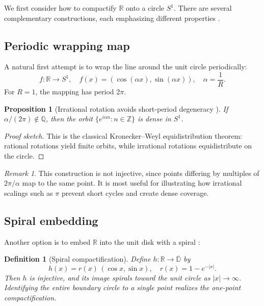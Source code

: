 \documentclass[12pt]{article}
\newtheorem{definition}{Definition}
\newtheorem{proposition}{Proposition}
\theoremstyle{remark}
\newtheorem*{remark}{Remark}
\begin{document}
We first consider how to compactify $\mathbb{R}$ onto a circle $S^1$. There are 
several complementary constructions, each emphasizing different properties 
\citep{Munkres2000,Hatcher2002,Needham1997}.

\subsection{Periodic wrapping map}
\label{sec:wrap}
A natural first attempt is to wrap the line around the unit circle periodically:
\begin{equation}\label{eq:wrap}
f: \mathbb{R} \to S^1, 
\quad f(x) = (\cos(\alpha x), \sin(\alpha x)), 
\quad \alpha = \frac{1}{R}.
\end{equation}
For $R=1$, the mapping has period $2\pi$. 

\begin{proposition}[Irrational rotation avoids short-period degeneracy {\citep{Weyl1916,Walters1982}}]
If $\alpha/(2\pi)\notin \mathbb{Q}$, then the orbit $\{e^{i\alpha n} : n \in \mathbb{Z}\}$ 
is dense in $S^1$. 
\end{proposition}

\begin{proof}[Proof sketch]
This is the classical Kronecker–Weyl equidistribution theorem: rational rotations 
yield finite orbits, while irrational rotations equidistribute on the circle.  
\end{proof}

\begin{remark}
This construction is not injective, since points differing by multiples of $2\pi/\alpha$ 
map to the same point. It is most useful for illustrating how irrational scalings 
such as $\pi$ prevent short cycles and create dense coverage.
\end{remark}

\subsection{Spiral embedding}
Another option is to embed $\mathbb{R}$ into the unit disk with a spiral 
\citep[cf.][]{Needham1997}:
\begin{definition}[Spiral compactification]
Define $h:\mathbb{R}\to \overline{\mathbb{D}}$ by
\[
h(x) = r(x)\,(\cos x, \sin x), \quad r(x) = 1-e^{-|x|}.
\]
Then $h$ is injective, and its image spirals toward the unit circle as 
$|x|\to\infty$. Identifying the entire boundary circle to a single point realizes 
the one-point compactification.
\end{definition}
\end{document}
